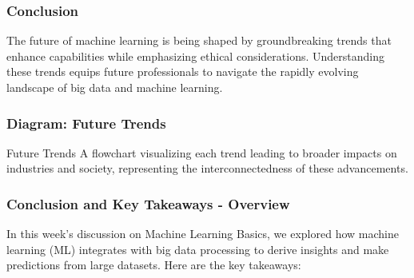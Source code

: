 \documentclass[aspectratio=169]{beamer}
\begin{document}
\begin{frame}[fragile]
    \frametitle{Conclusion}
    The future of machine learning is being shaped by groundbreaking trends that enhance capabilities while emphasizing ethical considerations. Understanding these trends equips future professionals to navigate the rapidly evolving landscape of big data and machine learning.
\end{frame}

\begin{frame}[fragile]
    \frametitle{Diagram: Future Trends}
    \begin{block}{Future Trends}
        A flowchart visualizing each trend leading to broader impacts on industries and society, representing the interconnectedness of these advancements.
    \end{block}
\end{frame}

\begin{frame}[fragile]
    \frametitle{Conclusion and Key Takeaways - Overview}
    In this week's discussion on Machine Learning Basics, we explored how machine learning (ML) integrates with big data processing to derive insights and make predictions from large datasets. Here are the key takeaways:
\end{frame}
\end{document}
